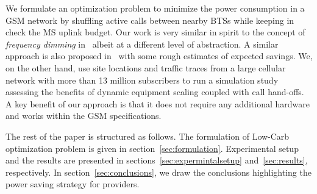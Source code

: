 We formulate an optimization problem to minimize the power
consumption in a GSM network by shuffling active calls between
nearby BTSs while keeping in check the MS uplink budget. Our
work is very similar in spirit to the concept of
\textit{frequency dimming}
in~\cite{Tipper:Dimming:Globecom:2010} albeit at a different
level of abstraction. A similar approach is also proposed
in~\cite{Blume:2010:BLTJ:CellularPower} with some rough
estimates of expected savings. We, on the other hand, use site
locations and traffic traces from a large cellular network with
more than 13 million subscribers to run a simulation study
assessing the benefits of dynamic equipment scaling coupled
with call hand-offs. A key benefit of our approach is that it 
does not require any additional hardware
and works within the GSM specifications.

The rest of the paper is structured as follows. The formulation
of Low-Carb optimization problem is given in
section~\ref{sec:formulation}. Experimental setup and the
results are presented in sections~\ref{sec:expermintalsetup}
and~\ref{sec:results}, respectively. In
section~\ref{sec:conclusions}, we draw the conclusions
highlighting the power saving strategy for providers.
